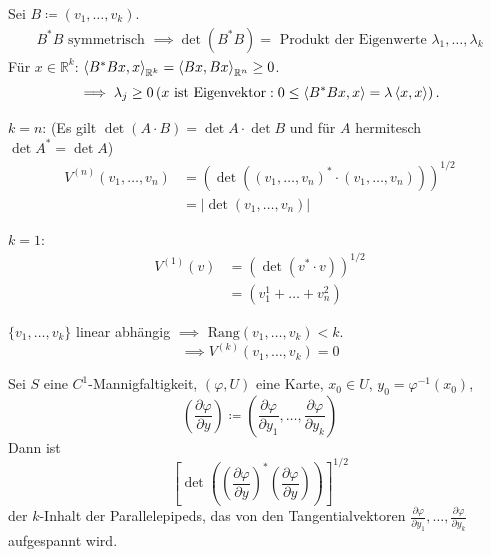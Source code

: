 \documentclass[a4paper,10pt]{scrbook}
\begin{document}
\begin{notice} \label{thm:11.2}
  \begin{enum-arab}
    \item Sei $B \coloneq (v_1 ,\ldots, v_k)$.
    \begin{align*}
      B^* B \text{ symmetrisch } \implies \det(B^* B) = \text{ Produkt der Eigenwerte } \lambda_1, \ldots, \lambda_k
    \end{align*}
    Für $x \in \mathbb{R}^k$: $\braket{B^* B x, x}_{\mathbb{R}^k} = \braket{B x, B x}_{\mathbb{R}^n} \geq 0$. \[ \implies \lambda_j \geq 0 \left( x \text{ ist Eigenvektor} : 0 \leq \braket{B^* B x, x} = \lambda \braket{x, x} \right). \]

    \item $k=n$: (Es gilt $\det(A \cdot B) = \det A \cdot \det B$ und für $A$ hermitesch $\det A^* = \det A$)
    \begin{align*}
      V^{(n)}(v_1 ,\ldots, v_n)
      &= \left(\det \left( (v_1 ,\ldots, v_n)^* \cdot (v_1 ,\ldots, v_n)\right)\right)^{1/2} \\
      &= \left| \det (v_1 ,\ldots, v_n) \right|
    \end{align*}

    \item $k=1$:
    \begin{align*}
      V^{(1)}(v)
      &= \left( \det(v^* \cdot v) \right)^{1/2} \\
      &= (v_1^1 + \ldots + v_n^2)
    \end{align*}

    \item $\{ v_1 ,\ldots, v_k \}$ linear abhängig $\implies$ $\mathrm{Rang}(v_1,\ldots,v_k) < k$. \[ \implies V^{(k)}(v_1,\ldots,v_k) = 0 \]

    \item Sei $S$ eine $C^1$-Mannigfaltigkeit, $(\varphi,U)$ eine Karte, $x_0 \in U$, $y_0 = \varphi^{-1}(x_0)$,\[ \left(\frac{\partial \varphi}{\partial y}\right) \coloneq \left( \frac{\partial \varphi}{\partial y_1},\ldots,\frac{\partial \varphi}{\partial y_k} \right) \]
    Dann ist \[ \left[ \det \left( \left( \frac{\partial \varphi}{\partial y} \right)^* \left( \frac{\partial \varphi}{\partial y} \right) \right) \right]^{1/2} \]
    der $k$-Inhalt der Parallelepipeds, das von den Tangentialvektoren $\frac{\partial \varphi}{\partial y_1},\ldots,\frac{\partial \varphi}{\partial y_k}$ aufgespannt wird.
  \end{enum-arab}
\end{notice}
\end{document}
